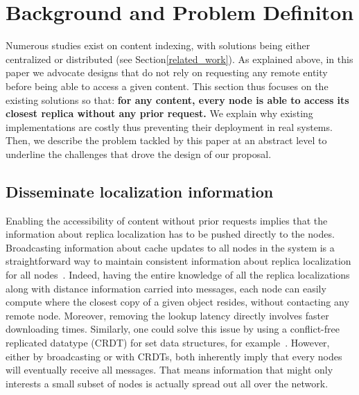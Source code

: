 \section{Background and Problem Definiton}
\label{sec:background}

Numerous studies exist on content indexing, with solutions being either centralized or distributed (see Section\ref{related_work}). As explained above, in this paper we advocate designs that do not rely on requesting any remote entity before being able to access a given content.
This section thus focuses on the existing solutions so that: \textbf{for any content, every node is able to access its closest replica without any prior request.}
We explain why existing implementations are costly thus preventing their deployment in real systems.
Then, we describe the problem tackled by this paper at an abstract level to underline the challenges that drove the design of our proposal. 


\subsection*{Disseminate localization information}
Enabling the accessibility of content without prior requests implies that the information about replica localization has to be pushed directly to the nodes.
Broadcasting information about cache updates to all nodes in the system is a straightforward way to maintain consistent information about replica localization for all nodes~\cite{nlsr,lscr}. Indeed, having the entire knowledge of all the replica localizations along with distance information carried into messages, each node can easily compute where the closest copy of a given object resides, without contacting any remote node. Moreover, removing the lookup latency directly involves faster downloading times. 
Similarly, one could solve this issue by using a conflict-free replicated datatype (CRDT) for set data structures, for example~\cite{shapiro2011crdts}. 
However, either by broadcasting or with CRDTs, both inherently imply that every nodes will eventually receive all messages. 
That means information that might only interests a small subset of nodes is actually spread out all over the network. 


